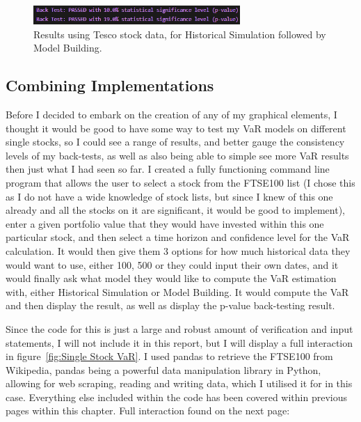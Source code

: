 \documentclass{article}
\begin{document}
\begin{figure}
  \centering
  \includegraphics[width=0.7\textwidth]{Images/Back-Testing Results.png}
  \caption{Results using Tesco stock data, for Historical Simulation followed by Model Building.}
  \label{fig:Back-Testing Results}
\end{figure}

\subsection{Combining Implementations}
Before I decided to embark on the creation of any of my graphical elements, I thought it would be good to have some way to test my VaR models on different single stocks, so I could see a range of results, and better gauge the consistency levels of my back-tests, as well as also being able to simple see more VaR results then just what I had seen so far. I created a fully functioning command line program that allows the user to select a stock from the FTSE100 list (I chose this as I do not have a wide knowledge of stock lists, but since I knew of this one already and all the stocks on it are significant, it would be good to implement), enter a given portfolio value that they would have invested within this one particular stock, and then select a time horizon and confidence level for the VaR calculation. It would then give them 3 options for how much historical data they would want to use, either 100, 500 or they could input their own dates, and it would finally ask what model they would like to compute the VaR estimation with, either Historical Simulation or Model Building. It would compute the VaR and then display the result, as well as display the p-value back-testing result.\\\vspace{0.3cm}

Since the code for this is just a large and robust amount of verification and input statements, I will not include it in this report, but I will display a full interaction in figure~\ref{fig:Single Stock VaR}. I used pandas to retrieve the FTSE100 from Wikipedia, pandas being a powerful data manipulation library in Python, allowing for web scraping, reading and writing data, which I utilised it for in this case. Everything else included within the code has been covered within previous pages within this chapter. Full interaction found on the next page:
\end{document}
